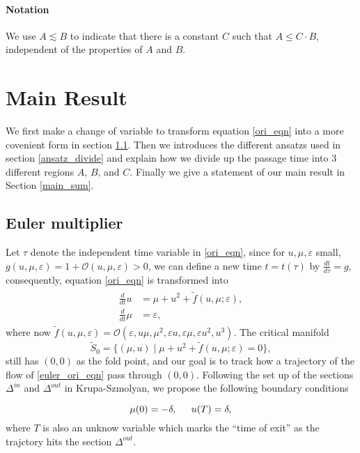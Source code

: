 \documentclass[letterpaper,11pt]{article}
\newcommand{\rmO}{\mathcal{O}}
\newcommand{\eps}{\varepsilon}
\newcommand{\lar}{ \lesssim }
\numberwithin{equation}{section}
\theoremstyle{plain}
\begin{document}
\paragraph{Notation}
We use $A \lar B$ to indicate that there is a constant $C$ such that $A \le C \cdot B$, independent of the properties of $A$ and $B$.



\section{Main Result}\label{sec_main}
We first make a change of variable to transform equation \eqref{ori_eqn} into a more covenient form in section \ref{euler_m}. Then we introduces the different ansatzs used in section \ref{ansatz_divide} and explain how we divide up the passage time into 3 different regions $A$, $B$, and $C$. Finally we give a statement of our main result in Section \ref{main_sum}. 

\subsection{Euler multiplier}\label{euler_m}
Let $\tau$ denote the independent time variable in \eqref{ori_eqn}, since for $u,\mu,\eps$ small, $g(u,\mu,\eps) = 1 + \rmO(u,\mu,\eps)>0$, we can define a new time $t = t(\tau)$ by $\frac{dt}{d\tau} = g$, consequently, equation \eqref{ori_eqn}  is transformed into
\begin{align}\label{euler_ori_eqn}
\begin{split}
\frac{d}{dt}u &= \mu+u^2+ \tilde{f}(u,\mu;\eps),\\
\frac{d}{dt}\mu &=  \eps ,
\end{split}
\end{align}
where now $\tilde{f}(u,\mu,\eps) = \rmO(\eps,  u\mu, \mu^2,\eps u, \eps \mu, \eps u^2, u^3)$.  The critical manifold 
\[
\tilde{S}_0 = \{ (\mu, u) \mid \mu + u^2 + \tilde{f}(u,\mu;\eps) = 0\},
\]
still has $(0,0)$ as the fold point, and our goal is to track how a trajectory of the flow of \eqref{euler_ori_eqn} pass through $(0,0)$. Following the set up of the sections $\Delta^{in}$ and $\Delta^{out}$ in Krupa-Szmolyan, we propose the following boundary conditions

\begin{equation}\label{ori_bc}
\mu(0) = -\delta, \hspace{0.2in} u(T) = \delta,
\end{equation}
where $T$ is also an unknow variable which marks the ``time of exit'' as the trajctory hits the section $\Delta^{out}$.
\end{document}
